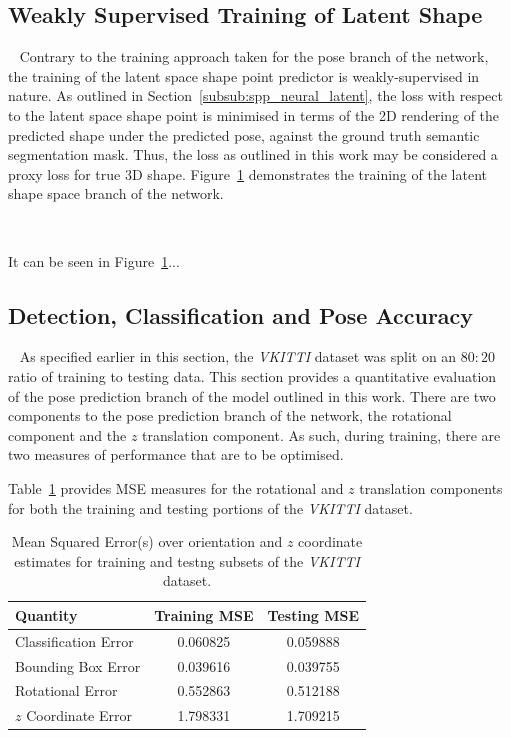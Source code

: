 \subsection{Weakly Supervised Training of Latent Shape}
~\label{sec:spp_quantitative_latentshape_train}
Contrary to the training approach taken for the pose branch of the network, the training of the latent space shape 
point predictor is weakly-supervised in nature. As outlined in Section~\ref{subsub:spp_neural_latent}, the loss with 
respect to the latent space shape point is minimised in terms of the 2D rendering of the predicted shape under the 
predicted pose, against the ground truth semantic segmentation mask. Thus, the loss as outlined in this work may be 
considered a proxy loss for true 3D shape. Figure~\ref{figure:spp_latent_point_train} demonstrates the training of the 
latent shape space branch of the network.

\begin{figure}[!htbp]
  \centering
  \caption[VKITTI Shape Training]{}
~\label{figure:spp_latent_point_train}
\end{figure}

It can be seen in Figure~\ref{figure:spp_latent_point_train}...

\subsection{Detection, Classification and Pose Accuracy}
~\label{sec:spp_quantitative_pose_accuracy}
As specified earlier in this section, the \textit{VKITTI} dataset was split on an \( 80:20 \) ratio of training to 
testing data. This section provides a quantitative evaluation of the pose prediction branch of the model outlined 
in this work. There are two components to the pose prediction branch of the network, the rotational component and 
the \( z \) translation component. As such, during training, there are two measures of performance that are to be optimised.

Table~\ref{table:spp_pose_mse} provides MSE measures for the rotational and \( z \) translation components for both the training 
and testing portions of the \textit{VKITTI} dataset.

\begin{table}[!htbp]
  \begin{center}
    \begin{tabular}{l c c}
      Quantity & Training MSE & Testing MSE \\
      \midrule
      Classification Error & 0.060825 & 0.059888\\
      Bounding Box Error & 0.039616 & 0.039755\\
      Rotational Error & 0.552863 & 0.512188\\
      \( z \) Coordinate Error & 1.798331 & 1.709215
    \end{tabular}
  \end{center}
  \caption[Pose Prediction Quantitative Performance]{Mean Squared Error(s) over orientation and \( z \) 
  coordinate estimates for training and testng subsets of the \textit{VKITTI} dataset.}
  ~\label{table:spp_pose_mse}
\end{table}

